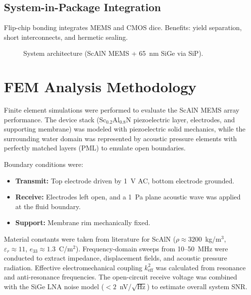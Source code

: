\documentclass[conference]{IEEEtran}
\begin{document}
\subsection{System-in-Package Integration}
Flip-chip bonding integrates MEMS and CMOS dice. Benefits: yield separation, short interconnects, and hermetic sealing.

\begin{figure}[t]
\centering
{}
\caption{System architecture (ScAlN MEMS + 65~nm SiGe via SiP).}
\label{fig:arch}
\end{figure}

\section{FEM Analysis Methodology}

Finite element simulations were performed to evaluate the
ScAlN MEMS array performance. The device stack (Sc$_{0.2}$Al$_{0.8}$N
piezoelectric layer, electrodes, and supporting membrane) was modeled
with piezoelectric solid mechanics, while the surrounding water domain
was represented by acoustic pressure elements with perfectly matched
layers (PML) to emulate open boundaries.

Boundary conditions were:
\begin{itemize}
  \item \textbf{Transmit:} Top electrode driven by 1~V AC, bottom electrode grounded.
  \item \textbf{Receive:} Electrodes left open, and a 1~Pa plane acoustic
        wave was applied at the fluid boundary.
  \item \textbf{Support:} Membrane rim mechanically fixed.
\end{itemize}

Material constants were taken from literature for
ScAlN ($\rho\!\approx\!3200$~kg/m$^3$, $\varepsilon_r\!\approx\!11$,
$e_{33}\!\approx\!1.3$~C/m$^2$). Frequency-domain sweeps from
10--50~MHz were conducted to extract impedance, displacement fields, and
acoustic pressure radiation. Effective electromechanical coupling
$k_\mathrm{eff}^2$ was calculated from resonance and anti-resonance
frequencies. The open-circuit receive voltage was combined with the SiGe
LNA noise model ($<2$~nV/$\sqrt{\mathrm{Hz}}$) to estimate overall
system SNR.
\end{document}
